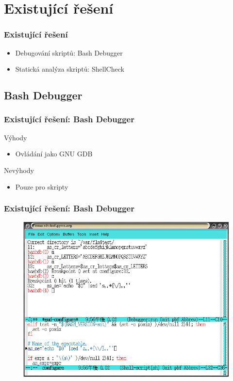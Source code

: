 \documentclass{beamer}
\begin{document}
\section{Existující řešení}
\begin{frame}
	\frametitle{Existující řešení}
	\begin{itemize}
		\item Debugování skriptů: Bash Debugger
		\item Statická analýza skriptů: ShellCheck
	\end{itemize}
\end{frame}

\subsection{Bash Debugger}
\begin{frame}
	\frametitle{Existující řešení: Bash Debugger}
	\begin{exampleblock}{Výhody}
		\begin{itemize}
			\item Ovládání jako GNU GDB
		\end{itemize}
	\end{exampleblock}
	\begin{alertblock}{Nevýhody}
		\begin{itemize}
			\item Pouze pro skripty
		\end{itemize}
	\end{alertblock}
	
		
\end{frame}
\begin{frame}
	\frametitle{Existující řešení: Bash Debugger}
	\begin{figure}
		\centering
		\includegraphics[width=1.0\textwidth]{./images/bashdb-break_invert}
	\end{figure}	
\end{frame}
\end{document}
